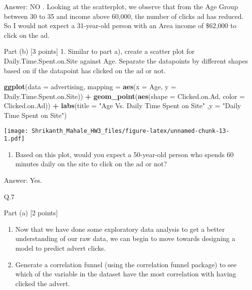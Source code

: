 \documentclass[]{article}
\newenvironment{Shaded}{\begin{snugshade}}{\end{snugshade}}
\newcommand{\KeywordTok}[1]{\textcolor[rgb]{0.13,0.29,0.53}{\textbf{#1}}}
\newcommand{\DataTypeTok}[1]{\textcolor[rgb]{0.13,0.29,0.53}{#1}}
\newcommand{\StringTok}[1]{\textcolor[rgb]{0.31,0.60,0.02}{#1}}
\newcommand{\OperatorTok}[1]{\textcolor[rgb]{0.81,0.36,0.00}{\textbf{#1}}}
\newcommand{\NormalTok}[1]{#1}
\providecommand{\tightlist}{%
  \setlength{\itemsep}{0pt}\setlength{\parskip}{0pt}}
\begin{document}
Answer: NO . Looking at the scatterplot, we observe that from the Age
Group between 30 to 35 and income above 60,000, the number of clicks ad
has reduced. So I would not expect a 31-year-old person with an Area
income of \$62,000 to click on the ad.

Part (b) {[}3 points{]} 1. Similar to part a), create a scatter plot for
Daily.Time.Spent.on.Site against Age. Separate the datapoints by
different shapes based on if the datapoint has clicked on the ad or not.

\begin{Shaded}
\begin{Highlighting}[]
\KeywordTok{ggplot}\NormalTok{(}\DataTypeTok{data =}\NormalTok{ advertising, }\DataTypeTok{mapping =} \KeywordTok{aes}\NormalTok{(}\DataTypeTok{x =}\NormalTok{ Age, }\DataTypeTok{y =}\NormalTok{ Daily.Time.Spent.on.Site)) }\OperatorTok{+}\StringTok{ }\KeywordTok{geom_point}\NormalTok{(}\KeywordTok{aes}\NormalTok{(}\DataTypeTok{shape =}\NormalTok{ Clicked.on.Ad, }\DataTypeTok{color =}\NormalTok{ Clicked.on.Ad))  }\OperatorTok{+}\StringTok{ }\KeywordTok{labs}\NormalTok{(}\DataTypeTok{title =} \StringTok{"Age Vs. Daily Time Spent on Site"}\NormalTok{ ,}\DataTypeTok{y =} \StringTok{"Daily Time Spent on Site"}\NormalTok{)}
\end{Highlighting}
\end{Shaded}

\texttt{[image: Shrikanth\_Mahale\_HW3\_files/figure-latex/unnamed-chunk-13-1.pdf]}

\begin{enumerate}
\def\labelenumi{\arabic{enumi}.}
\setcounter{enumi}{1}
\tightlist
\item
  Based on this plot, would you expect a 50-year-old person who spends
  60 minutes daily on the site to click on the ad or not?
\end{enumerate}

Answer: Yes.

Q.7

Part (a) {[}2 points{]}

\begin{enumerate}
\def\labelenumi{\arabic{enumi}.}
\item
  Now that we have done some exploratory data analysis to get a better
  understanding of our raw data, we can begin to move towards designing
  a model to predict advert clicks.
\item
  Generate a correlation funnel (using the correlation funnel package)
  to see which of the variable in the dataset have the most correlation
  with having clicked the advert.
\end{enumerate}
\end{document}
